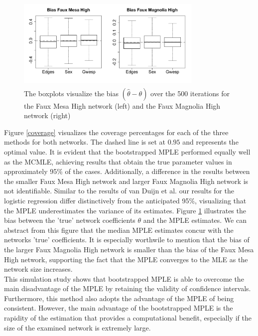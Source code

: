 \documentclass[10pt, conference, compsocconf]{IEEEtran}
\begin{document}
\begin{figure}[!t]
\centering
\includegraphics[width=3.5in, height=1.75in]{bias_plots_05}
\caption{The boxplots visualize the bias $(\hat{\theta}-\theta)$ over the 500 iterations for the Faux Mesa High network (left) and the Faux Magnolia High network (right)}
\label{bias}
\end{figure}
\noindent Figure \ref{coverage} visualizes the coverage percentages for each of the three methods for both networks. The dashed line is set at $0.95$ and represents the optimal value. It is evident that the bootstrapped MPLE performed equally well as the MCMLE, achieving results that obtain the true parameter values in approximately 95\% of the cases. Additionally, a difference in the results between the smaller Faux Mesa High network and larger Faux Magnolia High network is not identifiable. Similar to the results of van Duijn et al. \cite{vanDuijnetal2009} our results for the logistic regression differ distinctively from the anticipated 95\%, visualizing that the MPLE underestimates the variance of its estimates.
Figure \ref{bias} illustrates the bias between the 'true' network coefficients $\theta$ and the MPLE estimates. We can abstract from this figure that the median MPLE estimates concur with the networks 'true' coefficients. It is especially worthwile to mention that the bias of the larger Faux Magnolia High network is smaller than the bias of the Faux Mesa High network, supporting the fact that the MPLE converges to the MLE as the network size increases.\\
\noindent This simulation study shows that bootstrapped MPLE is able to overcome the main disadvantage of the MPLE by retaining the validity of confidence intervals. Furthermore, this method also adopts the advantage of the MPLE of being consistent. However, the main advantage of the bootstrapped MPLE is the rapidity of the estimation that provides a computational benefit, especially if the size of the examined network is extremely large.
\end{document}
